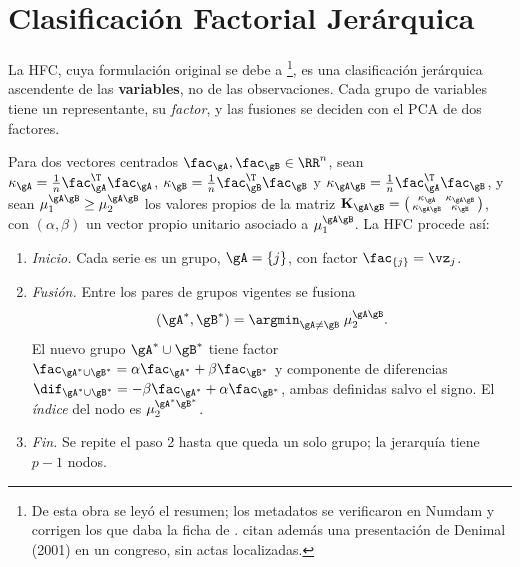\section{Clasificación Factorial Jerárquica}
\label{sec:hfc}

La HFC, cuya formulación original se debe a
\textcite{denimal_2007}\footnote{De esta obra se leyó el resumen; los metadatos se verificaron en
Numdam y corrigen los que daba la ficha de \textcite{camiz_et_al_2020}. \textcite{camiz_roig_2011}
citan además una presentación de Denimal (2001) en un congreso, sin actas localizadas.
}, es una clasificación jerárquica ascendente de las
\textbf{variables}, no de las observaciones. Cada grupo de variables tiene un representante, su
\emph{factor}, y las fusiones se deciden con el PCA de dos factores.

\begin{definicion}\label{def:hfc}
Para dos vectores centrados $\fac_{\gA},\fac_{\gB}\in\RR^n$, sean
$\kappa_{\gA}=\frac1n\fac_{\gA}^{\T}\fac_{\gA}$, $\kappa_{\gB}=\frac1n\fac_{\gB}^{\T}\fac_{\gB}$ y
$\kappa_{\gA\gB}=\frac1n\fac_{\gA}^{\T}\fac_{\gB}$, y sean $\mu_1^{\gA\gB}\ge\mu_2^{\gA\gB}$ los
valores propios de la matriz
$\mathbf{K}_{\gA\gB}=\bigl(\begin{smallmatrix}\kappa_{\gA}&\kappa_{\gA\gB}\\ \kappa_{\gA\gB}&\kappa_{\gB}
\end{smallmatrix}\bigr)$, con $(\alpha,\beta)$ un vector propio unitario asociado a
$\mu_1^{\gA\gB}$. La HFC procede así:
\begin{enumerate}[label=\arabic*.]
  \item \emph{Inicio.} Cada serie es un grupo, $\gA=\{j\}$, con factor $\fac_{\{j\}}=\vz_j$.
  \item \emph{Fusión.} Entre los pares de grupos vigentes se fusiona
    \begin{equation}\label{eq:hfc}
      (\gA^\ast,\gB^\ast)=\argmin_{\gA\ne\gB}\;\mu_2^{\gA\gB}.
    \end{equation}
    El nuevo grupo $\gA^\ast\cup\gB^\ast$ tiene factor
    $\fac_{\gA^\ast\cup\gB^\ast}=\alpha\fac_{\gA^\ast}+\beta\fac_{\gB^\ast}$ y componente de
    diferencias $\dif_{\gA^\ast\cup\gB^\ast}=-\beta\fac_{\gA^\ast}+\alpha\fac_{\gB^\ast}$, ambas
    definidas salvo el signo. El \emph{índice} del nodo es $\mu_2^{\gA^\ast\gB^\ast}$.
  \item \emph{Fin.} Se repite el paso 2 hasta que queda un solo grupo; la jerarquía tiene $p-1$
    nodos.
\end{enumerate}
\end{definicion}

